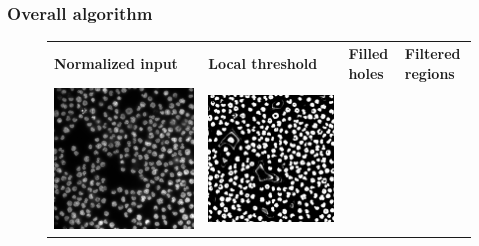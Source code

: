 \subsubsection{Overall algorithm}

\begin{figure}[H]
    \centering
    \centering
        \begin{tabularx}{\textwidth}{YYYY}
            \textbf{Normalized input} &
            \textbf{Local threshold} &
            \textbf{Filled holes} &
            \textbf{Filtered regions} \\
            \includegraphics{bilder/segmentation/nuclei-mask/normalized.png} & \includegraphics{bilder/segmentation/nuclei-mask/binary_local.png} &

\end{tabularx}
\end{figure}
